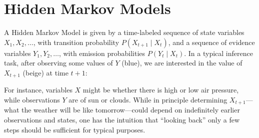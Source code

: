 \documentclass[10pt,letterpaper]{article}
\begin{document}
\section{Hidden Markov Models}

A Hidden Markov Model is given by a time-labeled sequence of state variables $X_1,X_2,\dots$, with transition probability $P(X_{t+1}\mid X_t)$, and a sequence of evidence variables $Y_1,Y_2,\dots$, with emission probabilities $P(Y_t\mid X_t)$. In a typical inference task, after observing some values of $Y$ (blue), we are interested in the value of $X_{t+1}$ (beige) at time $t+1$:

\begin{figure}[h] 
\begin{center}
\end{center} 
\end{figure} 
\noindent For instance, variables $X$ might be whether there is high or low air pressure, while observations $Y$ are of sun or clouds. While in principle determining $X_{t+1}$---what the weather will be like tomorrow---could depend on indefinitely earlier observations and states, one has the intuition that ``looking back'' only a few steps should be sufficient for typical purposes.
\end{document}
